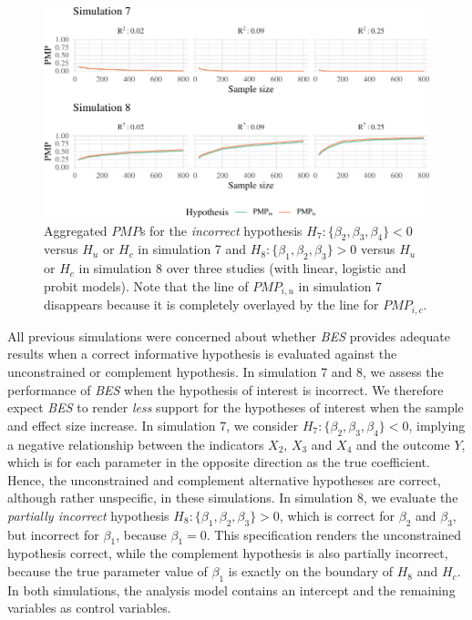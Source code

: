 \documentclass[review, 3p, authoryear]{elsarticle} %
\begin{document}
\begin{figure}
\includegraphics[width=1\linewidth]{manuscript_volker_files/figure-latex/PMP78-1} \caption{Aggregated $PMP$s for the \textit{incorrect} hypothesis $H_7: \{\beta_2, \beta_3, \beta_4\} < 0$ versus $H_u$ or $H_c$ in simulation 7 and $H_8: \{\beta_1, \beta_2, \beta_3\} > 0$ versus $H_u$ or $H_c$ in simulation 8 over three studies (with linear, logistic and probit models). Note that the line of $PMP_{i,u}$ in simulation 7 disappears because it is completely overlayed by the line for $PMP_{i,c}$.}\label{fig:PMP78}
\end{figure}

All previous simulations were concerned about whether \emph{BES} provides adequate results when a correct informative hypothesis is evaluated against the unconstrained or complement hypothesis.
In simulation 7 and 8, we assess the performance of \emph{BES} when the hypothesis of interest is incorrect.
We therefore expect \emph{BES} to render \emph{less} support for the hypotheses of interest when the sample and effect size increase.
In simulation 7, we consider \(H_7: \{\beta_2, \beta_3, \beta_4\} < 0\), implying a negative relationship between the indicators \(X_2\), \(X_3\) and \(X_4\) and the outcome \(Y\), which is for each parameter in the opposite direction as the true coefficient.
Hence, the unconstrained and complement alternative hypotheses are correct, although rather unspecific, in these simulations.
In simulation 8, we evaluate the \emph{partially incorrect} hypothesis \(H_8: \{\beta_1, \beta_2, \beta_3\} > 0\), which is correct for \(\beta_2\) and \(\beta_3\), but incorrect for \(\beta_1\), because \(\beta_1 = 0\).
This specification renders the unconstrained hypothesis correct, while the complement hypothesis is also partially incorrect, because the true parameter value of \(\beta_1\) is exactly on the boundary of \(H_8\) and \(H_c\).
In both simulations, the analysis model contains an intercept and the remaining variables as control variables.
\end{document}

